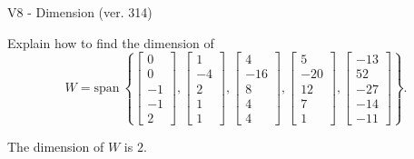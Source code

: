\begin{exercise}
  \begin{exerciseTitle}V8 - Dimension (ver. 314)\end{exerciseTitle}
  \begin{exerciseStatement}
    Explain how to find the dimension of 
\[W=\mathrm{span}\ \left\{\left[\begin{array}{r}
0 \\
0 \\
-1 \\
-1 \\
2
\end{array}\right] , \left[\begin{array}{r}
1 \\
-4 \\
2 \\
1 \\
1
\end{array}\right] , \left[\begin{array}{r}
4 \\
-16 \\
8 \\
4 \\
4
\end{array}\right] , \left[\begin{array}{r}
5 \\
-20 \\
12 \\
7 \\
1
\end{array}\right] , \left[\begin{array}{r}
-13 \\
52 \\
-27 \\
-14 \\
-11
\end{array}\right]\right\}.\]



  \end{exerciseStatement}
  \begin{exerciseAnswer}
   The dimension of \(W\) is  \(2\).
  


  \end{exerciseAnswer}
\end{exercise}